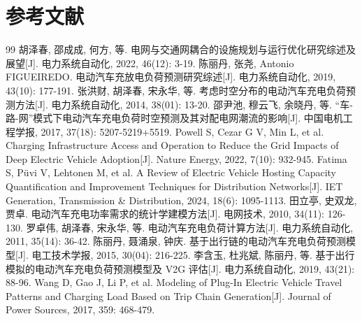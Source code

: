 \documentclass[10pt,a4paper]{article}
\providecommand{\songti}{}
\renewcommand{\songti}{\thesissong}
\numberwithin{equation}{section}
\numberwithin{table}{section}
\numberwithin{figure}{section}
\newcommand{\thesisbodyfont}{\setstretch{1}\songti\fontsize{12pt}{20pt}\selectfont}
\begin{document}
    \newpage
    \section*{参考文献}
    \begingroup
    \thesisbodyfont
    \setlength{\baselineskip}{20pt}
    \setlength{\bibsep}{0pt}
    \renewcommand{\section}[2]{}

    \begin{thebibliography}{99}
        \thesisbodyfont
        \setlength{\baselineskip}{20pt}
        \setlength{\itemsep}{0pt}
        \setlength{\parskip}{0pt}
        \setlength{\parsep}{0pt}
        \setlength{\topsep}{0pt}
         胡泽春, 邵成成, 何方, 等. 电网与交通网耦合的设施规划与运行优化研究综述及展望[J]. 电力系统自动化, 2022, 46(12): 3-19.
         陈丽丹, 张尧, Antonio FIGUEIREDO. 电动汽车充放电负荷预测研究综述[J]. 电力系统自动化, 2019, 43(10): 177-191.
         张洪财, 胡泽春, 宋永华, 等. 考虑时空分布的电动汽车充电负荷预测方法[J]. 电力系统自动化, 2014, 38(01): 13-20.
         邵尹池, 穆云飞, 余晓丹, 等. “车-路-网”模式下电动汽车充电负荷时空预测及其对配电网潮流的影响[J]. 中国电机工程学报, 2017, 37(18): 5207-5219+5519.
         Powell S, Cezar G V, Min L, et al. Charging Infrastructure Access and Operation to Reduce the Grid Impacts of Deep Electric Vehicle Adoption[J]. Nature Energy, 2022, 7(10): 932-945.
         Fatima S, P\"uvi V, Lehtonen M, et al. A Review of Electric Vehicle Hosting Capacity Quantification and Improvement Techniques for Distribution Networks[J]. IET Generation, Transmission \& Distribution, 2024, 18(6): 1095-1113.
         田立亭, 史双龙, 贾卓. 电动汽车充电功率需求的统计学建模方法[J]. 电网技术, 2010, 34(11): 126-130.
         罗卓伟, 胡泽春, 宋永华, 等. 电动汽车充电负荷计算方法[J]. 电力系统自动化, 2011, 35(14): 36-42.
         陈丽丹, 聂涌泉, 钟庆. 基于出行链的电动汽车充电负荷预测模型[J]. 电工技术学报, 2015, 30(04): 216-225.
         李含玉, 杜兆斌, 陈丽丹, 等. 基于出行模拟的电动汽车充电负荷预测模型及 V2G 评估[J]. 电力系统自动化, 2019, 43(21): 88-96.
         Wang D, Gao J, Li P, et al. Modeling of Plug-In Electric Vehicle Travel Patterns and Charging Load Based on Trip Chain Generation[J]. Journal of Power Sources, 2017, 359: 468-479.

\end{thebibliography}
\end{document}
